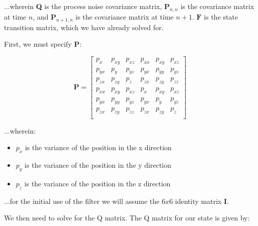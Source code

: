 \documentclass{article}
\begin{document}
...wherein \textbf{Q} is the process noise covariance matrix, $\textbf{P}_{n,n}$ is the covariance matrix at time $n$, and $\textbf{P}_{n+1,n}$ is the covariance matrix at time $n+1$. $\textbf{F}$ is the state transition matrix, which we have already solved for.

First, we must specify $\textbf{P}$:

\begin{equation}
    \textbf{P} = \begin{bmatrix}
        p_x          & p_{xy}       & p_{xz}       & p_{x\dot{x}} & p_{x\dot{y}}       & p_{x\dot{z}}       \\
        p_{yx}       & p_y          & p_{yz}       & p_{y\dot{x}} & p_{y\dot{y}}       & p_{y\dot{z}}       \\
        p_{zx}       & p_{zy}       & p_z          & p_{z\dot{x}} & p_{z\dot{y}}       & p_{z\dot{z}}       \\
        p_{\dot{x}x} & p_{\dot{x}y} & p_{\dot{x}z} & p_{\dot{x}}  & p_{\dot{x}\dot{y}} & p_{\dot{x}\dot{z}} \\
        p_{\dot{y}x} & p_{\dot{y}y} & p_{\dot{y}z} & p_{\dot{y}x} & p_{\dot{y}}        & p_{\dot{y}\dot{z}} \\
        p_{\dot{z}x} & p_{\dot{z}y} & p_{\dot{z}z} & p_{\dot{z}x} & p_{\dot{z}y}       & p_{\dot{z}}        \\
    \end{bmatrix}
\end{equation}

...wherein:

\begin{itemize}
    \item $p_x$ is the variance of the position in the x direction
    \item $p_y$ is the variance of the position in the y direction
    \item $p_z$ is the variance of the position in the z direction
\end{itemize}

...for the initial use of the filter we will assume the $6x6$ identity matrix \textbf{I}.

We then need to solve for the Q matrix. The Q matrix for our state is given by:
\end{document}
